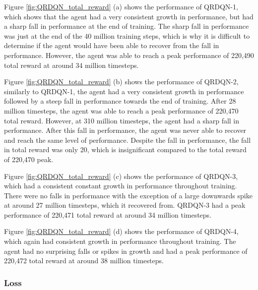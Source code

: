 Figure \ref{fig:QRDQN_total_reward} (a) shows the performance of QRDQN-1, which shows that the agent had a very consistent growth in performance, but had a sharp fall in performance at the end of training. The sharp fall in performance was just at the end of the 40 million training steps, which is why it is difficult to determine if the agent would have been able to recover from the fall in performance. However, the agent was able to reach a peak performance of 220,490 total reward at around 34 million timesteps. 

Figure \ref{fig:QRDQN_total_reward} (b) shows the performance of QRDQN-2, similarly to QRDQN-1, the agent had a very consistent growth in performance followed by a steep fall in performance towards the end of training. After 28 million timesteps, the agent was able to reach a peak performance of 220,470 total reward. However, at 310 million timesteps, the agent had a sharp fall in performance. After this fall in performance, the agent was never able to recover and reach the same level of performance. Despite the fall in performance, the fall in total reward was only 20, which is insignificant compared to the total reward of 220,470 peak.

Figure \ref{fig:QRDQN_total_reward} (c) shows the performance of QRDQN-3, which had a consistent constant growth in performance throughout training. There were no falls in performance with the exception of a large downwards spike at around 27 million timesteps, which it recovered from. QRDQN-3 had a peak performance of 220,471 total reward at around 34 million timesteps.

Figure \ref{fig:QRDQN_total_reward} (d) shows the performance of QRDQN-4, which again had consistent growth in performance throughout training. The agent had no surprising falls or spikes in growth and had a peak performance of 220,472 total reward at around 38 million timesteps.

\subsubsection*{Loss}

